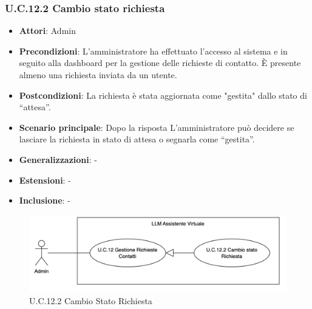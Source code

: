 \subsubsection{U.C.12.2 Cambio stato richiesta}
\begin{itemize}
    \item \textbf{Attori}: Admin
    \item \textbf{Precondizioni}: L’amministratore ha effettuato l’accesso al sistema e in seguito alla dashboard per la gestione delle richieste di contatto. È presente almeno una richiesta inviata da un utente.
    \item \textbf{Postcondizioni}: La richiesta è stata aggiornata come "gestita" dallo stato di “attesa”.
    \item \textbf{Scenario principale}: Dopo la risposta L’amministratore può decidere se lasciare la richiesta in stato di attesa o segnarla come “gestita”.
    \item \textbf{Generalizzazioni}: -
    \item \textbf{Estensioni}: -
    \item \textbf{Inclusione}: -
\end{itemize}
\begin{figure}[H]
    \centering
    \includegraphics[width=\textwidth]{img/U.C.12.2.png}
    \caption{U.C.12.2 Cambio Stato Richiesta}
\end{figure}
\newpage

